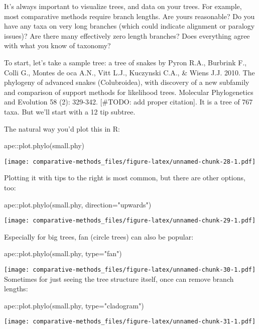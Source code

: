 \documentclass[
]{article}
\newenvironment{Shaded}{\begin{snugshade}}{\end{snugshade}}
\newcommand{\AttributeTok}[1]{\textcolor[rgb]{0.77,0.63,0.00}{#1}}
\newcommand{\FunctionTok}[1]{\textcolor[rgb]{0.00,0.00,0.00}{#1}}
\newcommand{\NormalTok}[1]{#1}
\newcommand{\SpecialCharTok}[1]{\textcolor[rgb]{0.00,0.00,0.00}{#1}}
\newcommand{\StringTok}[1]{\textcolor[rgb]{0.31,0.60,0.02}{#1}}
\begin{document}
It's always important to visualize trees, and data on your trees. For example, most comparative methods require branch lengths. Are yours reasonable? Do you have any taxa on very long branches (which could indicate alignment or paralogy issues)? Are there many effectively zero length branches? Does everything agree with what you know of taxonomy?

To start, let's take a sample tree: a tree of snakes by Pyron R.A., Burbrink F., Colli G., Montes de oca A.N., Vitt L.J., Kuczynski C.A., \& Wiens J.J. 2010. The phylogeny of advanced snakes (Colubroidea), with discovery of a new subfamily and comparison of support methods for likelihood trees. Molecular Phylogenetics and Evolution 58 (2): 329-342. {[}\#TODO: add proper citation{]}. It is a tree of 767 taxa. But we'll start with a 12 tip subtree.

The natural way you'd plot this in R:

\begin{Shaded}
\begin{Highlighting}[]
\NormalTok{ape}\SpecialCharTok{::}\FunctionTok{plot.phylo}\NormalTok{(small.phy)}
\end{Highlighting}
\end{Shaded}

\texttt{[image: comparative-methods\_files/figure-latex/unnamed-chunk-28-1.pdf]}

Plotting it with tips to the right is most common, but there are other options, too:

\begin{Shaded}
\begin{Highlighting}[]
\NormalTok{ape}\SpecialCharTok{::}\FunctionTok{plot.phylo}\NormalTok{(small.phy, }\AttributeTok{direction=}\StringTok{"upwards"}\NormalTok{)}
\end{Highlighting}
\end{Shaded}

\texttt{[image: comparative-methods\_files/figure-latex/unnamed-chunk-29-1.pdf]}

Especially for big trees, fan (circle trees) can also be popular:

\begin{Shaded}
\begin{Highlighting}[]
\NormalTok{ape}\SpecialCharTok{::}\FunctionTok{plot.phylo}\NormalTok{(small.phy, }\AttributeTok{type=}\StringTok{"fan"}\NormalTok{)}
\end{Highlighting}
\end{Shaded}

\texttt{[image: comparative-methods\_files/figure-latex/unnamed-chunk-30-1.pdf]}
Sometimes for just seeing the tree structure itself, once can remove branch lengths:

\begin{Shaded}
\begin{Highlighting}[]
\NormalTok{ape}\SpecialCharTok{::}\FunctionTok{plot.phylo}\NormalTok{(small.phy, }\AttributeTok{type=}\StringTok{"cladogram"}\NormalTok{)}
\end{Highlighting}
\end{Shaded}

\texttt{[image: comparative-methods\_files/figure-latex/unnamed-chunk-31-1.pdf]}

  
\end{document}
